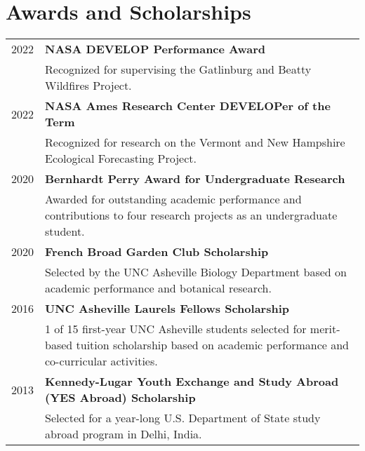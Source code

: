 \section{Awards and Scholarships}

\setlength{\arrayrulewidth}{.01pt}
\setlength{\tabcolsep}{8pt}

\begin{tabular}{r| L{16cm}}

    2022 & \textbf{NASA DEVELOP Performance Award} \\
    & Recognized for supervising the Gatlinburg and Beatty Wildfires Project.\\
    2022 & \textbf{NASA Ames Research Center DEVELOPer of the Term} \\
    & Recognized for research on the Vermont and New Hampshire Ecological Forecasting Project.\\
    2020 & \textbf{Bernhardt Perry Award for Undergraduate Research} \\
    & Awarded for outstanding academic performance and contributions to four research projects as an undergraduate student.\\
    2020 & \textbf{French Broad Garden Club Scholarship} \\
    & Selected by the UNC Asheville Biology Department based on academic performance and botanical research.\\
    2016 & \textbf{UNC Asheville Laurels Fellows Scholarship} \\
    & 1 of 15 first-year UNC Asheville students selected for merit-based tuition scholarship based on academic performance and co-curricular activities.\\
    2013 & \textbf{Kennedy-Lugar Youth Exchange and Study Abroad (YES Abroad) Scholarship } \\
    & Selected for a year-long U.S. Department of State study abroad program in Delhi, India.\\

\end{tabular}